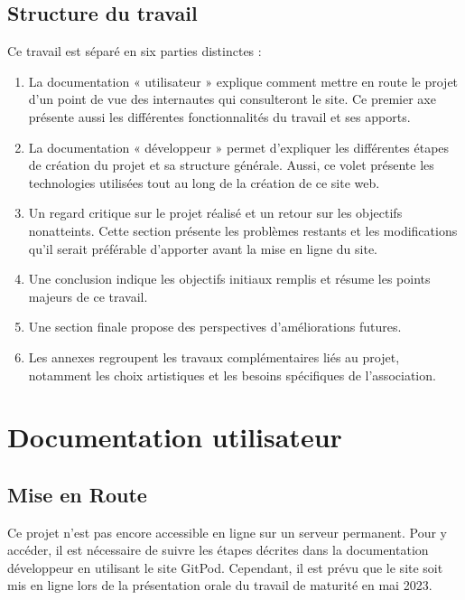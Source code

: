 \documentclass[a4,10pt,french]{sphinxmanual}
\begin{document}
\section{Structure du travail}
\label{\detokenize{introduction:structure-du-travail}}
\sphinxAtStartPar
Ce travail est séparé en six parties distinctes :
\begin{enumerate}
%
\item {} 
\sphinxAtStartPar
La documentation « utilisateur » explique comment mettre en route le projet d’un point de vue des internautes qui consulteront le site. Ce premier axe présente aussi les différentes fonctionnalités du travail et ses apports.

\item {} 
\sphinxAtStartPar
La documentation « développeur » permet d’expliquer les différentes étapes de création du projet et sa structure générale. Aussi, ce volet présente les technologies utilisées tout au long de la création de ce site web.

\item {} 
\sphinxAtStartPar
Un regard critique sur le projet réalisé et un retour sur les objectifs non\sphinxhyphen{}atteints. Cette section présente les problèmes restants et les modifications qu’il serait préférable d’apporter avant la mise en ligne du site.

\item {} 
\sphinxAtStartPar
Une conclusion indique les objectifs initiaux remplis et résume les points majeurs de ce travail.

\item {} 
\sphinxAtStartPar
Une section finale propose des perspectives d’améliorations futures.

\item {} 
\sphinxAtStartPar
Les annexes regroupent les travaux complémentaires liés au projet, notamment les choix artistiques et les besoins spécifiques de l’association.

\end{enumerate}


\chapter{Documentation utilisateur}
\label{\detokenize{chapitre-01:documentation-utilisateur}}\label{\detokenize{chapitre-01::doc}}

\section{Mise en Route}
\label{\detokenize{chapitre-01:mise-en-route}}
\sphinxAtStartPar
Ce projet n’est pas encore accessible en ligne sur un serveur permanent. Pour y accéder, il est nécessaire de suivre les étapes décrites dans la documentation développeur en utilisant le site GitPod. Cependant, il est prévu que le site soit mis en ligne lors de la présentation orale du travail de maturité en mai 2023.
\end{document}
